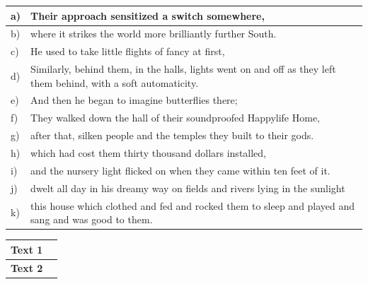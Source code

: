 \documentclass[11pt,a4paper]{article}
\begin{document}
\begin{tabularx}{\textwidth}{|p{}|Y|}
\hline
a) & Their approach sensitized a switch somewhere, \\
\hline
b) & where it strikes the world more brilliantly further South. \\
\hline
c) & He used to take little flights of fancy at first, \\
\hline
d) & Similarly, behind them, in the halls, lights went on and off as they left them behind, with a soft automaticity. \\
\hline
e) & And then he began to imagine butterflies there; \\
\hline
f) & They walked down the hall of their soundproofed Happylife Home, \\
\hline
g) & after that, silken people and the temples they built to their gods. \\
\hline
h) & which had cost them thirty thousand dollars installed, \\
\hline
i) & and the nursery light flicked on when they came within ten feet of it. \\
\hline
j) & dwelt all day in his dreamy way on fields and rivers lying in the sunlight \\
\hline
k) & this house which clothed and fed and rocked them to sleep and played and sang and was good to them. \\
\hline
\end{tabularx}

\begin{tabularx}{\textwidth}{|p{}|Y|}
\hline
\textbf{Text 1} & \\[4cm]
\hline
\textbf{Text 2} & \\[4cm]
\hline
\end{tabularx}
\end{document}
